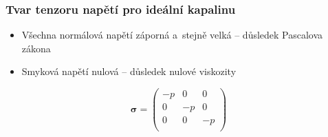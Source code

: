 
\subsubsection{Tvar tenzoru napětí pro ideální kapalinu}
\begin{itemize}
	\item Všechna normálová napětí záporná a~stejně velká -- důsledek Pascalova zákona
	\item Smyková napětí nulová -- důsledek nulové viskozity
\end{itemize}

\begin{equation}
	\bm{\sigma} = \left(\begin{matrix}
		-p &  0 &  0\\
		 0 & -p &  0\\
		 0 &  0 & -p\\
	\end{matrix}\right)
\end{equation}
